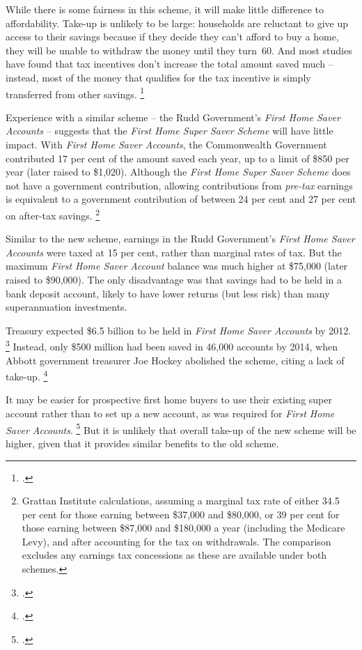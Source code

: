 While there is some fairness in this scheme, it will make little difference to affordability.
Take-up is unlikely to be large: households are reluctant to give up access to their savings because if they decide they can't afford to buy a home, they will be unable to withdraw the money until they turn~60.
And most studies have found that tax incentives don't increase the total amount saved much -- instead, most of the money that qualifies for the tax incentive is simply transferred from other savings.%
	\footcite[][20]{DaleyCoatesWood-2015-Super-tax-targeting}

Experience with a similar scheme -- the Rudd Government's \textit{First Home Saver Accounts} -- suggests that the \textit{First Home Super Saver Scheme} will have little impact.
With \textit{First Home Saver Accounts}, the Commonwealth Government contributed 17 per cent of the amount saved each year, up to a limit of \$850 per year (later raised to \$1,020).
Although the \textit{First Home Super Saver Scheme} does not have a government contribution, allowing contributions from \textit{pre-tax} earnings is equivalent to a government contribution of between 24 per cent and 27 per cent on after-tax savings.%
	\footnote{Grattan Institute calculations, assuming a marginal tax rate of either 34.5 per cent for those earning between \$37,000 and \$80,000, or 39 per cent for those earning between \$87,000 and \$180,000 a year (including the Medicare Levy), and after accounting for the tax on withdrawals. The comparison excludes any earnings tax concessions as these are available under both schemes.}

Similar to the new scheme, earnings in the Rudd Government's \textit{First Home Saver Accounts} were taxed at 15 per cent, rather than marginal rates of tax.
But the maximum \textit{First Home Saver Account} balance was much higher at \$75,000 (later raised to \$90,000).
The only disadvantage was that savings had to be held in a bank deposit account, likely to have lower returns (but less risk) than many superannuation investments.

Treasury expected \$6.5 billion to be held in \textit{First Home Saver Accounts} by 2012.%
	\footcite{Swan-2008-1st-Home-Save-Accounts}
Instead, only \$500 million had been saved in 46,000 accounts by 2014, when Abbott government treasurer Joe Hockey abolished the scheme, citing a lack of take-up.%
	\footcite{Hockey-2014-1st-Home-Save-Accounts-abolition}

It may be easier for prospective first home buyers to use their existing super account rather than to set up a new account, as was required  for \textit{First Home Saver Accounts}.%
    \footcite{Chancellor_2011_low_take_up_fhsa}
But it is unlikely that overall take-up of the new scheme will be higher, given that it provides similar benefits to the old scheme.


